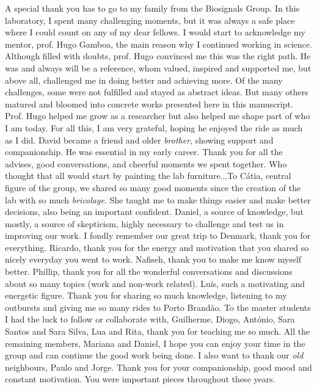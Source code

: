 \begin{ntacknowledgements}
A special thank you has to go to my family from the Biosignals Group. In this laboratory, I spent many challenging moments, but it was always a safe place where I could count on any of my dear fellows. I would start to acknowledge my mentor, prof. Hugo Gamboa, the main reason why I continued working in science. Although filled with doubts, prof. Hugo convinced me this was the right path. He was and always will be a reference, whom valued, inspired and supported me, but above all, challenged me in doing better and achieving more. Of the many challenges, some were not fulfilled and stayed as abstract ideas. But many others matured and bloomed into concrete works presented here in this manuscript. Prof. Hugo helped me grow as a researcher but also helped me shape part of who I am today. For all this, I am very grateful, hoping he enjoyed the ride as much as I did. David became a friend and older \textit{brother}, showing support and companionship. He was essential in my early career. Thank you for all the advises, good conversations, and cheerful moments we spent together. Who thought that all would start by painting the lab furniture...To Cátia, central figure of the group, we shared so many good moments since the creation of the lab with so much \textit{bricolage}. She taught me to make things easier and make better decisions, also being an important confident. Daniel, a source of knowledge, but mostly, a source of skepticism, highly necessary to challenge and test us in improving our work. I fondly remember our great trip to Denmark, thank you for everything. Ricardo, thank you for the energy and motivation that you shared so nicely everyday you went to work. Nafiseh, thank you to make me know myself better. Phillip, thank you for all the wonderful conversations and discussions about so many topics (work and non-work related). Luís, such a motivating and energetic figure. Thank you for sharing so much knowledge, listening to my outbursts and giving me so many rides to Porto Brandão. To the master students I had the luck to follow or collaborate with, Guilherme, Diogo, António, Sara Santos and Sara Silva, Lua and Rita, thank you for teaching me so much. All the remaining members, Mariana and Daniel, I hope you can enjoy your time in the group and can continue the good work being done. I also want to thank our \textit{old} neighbours, Paulo and Jorge. Thank you for your companionship, good mood and constant motivation. You were important pieces throughout these years.


\end{ntacknowledgements}
